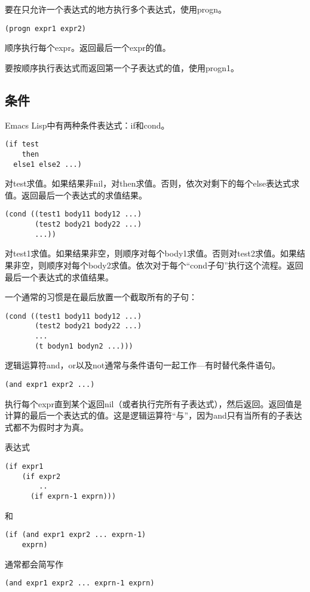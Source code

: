要在只允许一个表达式的地方执行多个表达式，使用progn。
\begin{verbatim}
(progn expr1 expr2)
\end{verbatim}

顺序执行每个expr。返回最后一个expr的值。

要按顺序执行表达式而返回第一个子表达式的值，使用progn1。

\subsection{条件}
\label{section:B-Conditionals}

Emacs Lisp中有两种条件表达式：if和cond。
\begin{verbatim}
(if test
    then
  else1 else2 ...)
\end{verbatim}
对test求值。如果结果非nil，对then求值。否则，依次对剩下的每个else表达式求值。返回最后一个表达式的求值结果。

\begin{verbatim}
(cond ((test1 body11 body12 ...)
       (test2 body21 body22 ...)
       ...))
\end{verbatim}
对test1求值。如果结果非空，则顺序对每个body1求值。否则对test2求值。如果结果非空，则顺序对每个body2求值。依次对于每个“cond子句”执行这个流程。返回最后一个表达式的求值结果。

一个通常的习惯是在最后放置一个截取所有的子句：
\begin{verbatim}
(cond ((test1 body11 body12 ...)
       (test2 body21 body22 ...)
       ...
       (t bodyn1 bodyn2 ...)))
\end{verbatim}

逻辑运算符and，or以及not通常与条件语句一起工作---有时替代条件语句。

\begin{verbatim}
(and expr1 expr2 ...)
\end{verbatim}
执行每个expr直到某个返回nil（或者执行完所有子表达式），然后返回。返回值是计算的最后一个表达式的值。这是逻辑运算符“与”，因为and只有当所有的子表达式都不为假时才为真。

表达式
\begin{verbatim}
(if expr1
    (if expr2
        ..
      (if exprn-1 exprn)))
\end{verbatim}
和
\begin{verbatim}
(if (and expr1 expr2 ... exprn-1)
    exprn)
\end{verbatim}
通常都会简写作
\begin{verbatim}
(and expr1 expr2 ... exprn-1 exprn)
\end{verbatim}

